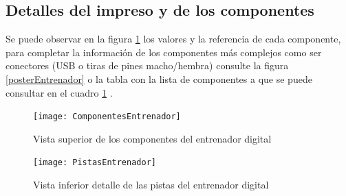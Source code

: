 \subsection{Detalles del impreso y de los componentes}
Se puede observar en la figura \ref{ComponentesEntrenador} los valores y la referencia de cada componente, para completar la información de los componentes más complejos como ser conectores (USB o tiras de pines macho/hembra) consulte la figura \ref{posterEntrenador} o la tabla con la lista de componentes a que se puede consultar en el cuadro \ref{ComponentesEntrenador} . 
\begin{figure}
	\centering\texttt{[image: ComponentesEntrenador]}	\caption{Vista superior de los componentes del entrenador digital}\label{ComponentesEntrenador}
\end{figure}%
\begin{figure}[htb]
	\centering\texttt{[image: PistasEntrenador]}	\caption{Vista inferior detalle de las pistas del entrenador digital}\label{PistaEntrenador}
\end{figure}%
